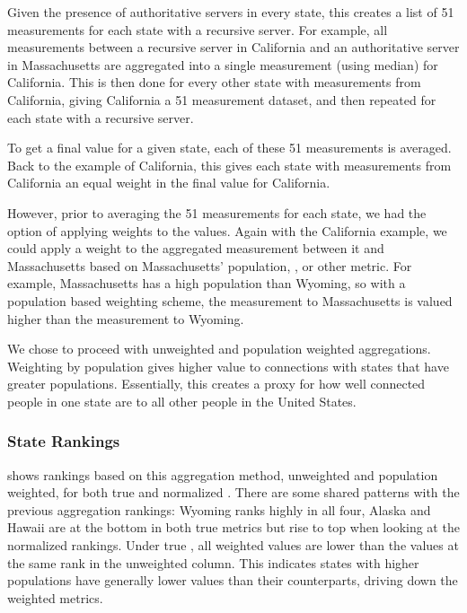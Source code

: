Given the presence of authoritative servers in every state, this creates a list of 51 measurements for each state with a recursive server. For example, all measurements between a recursive server in California and an authoritative server in Massachusetts are aggregated into a single measurement (using median) for California. This is then done for every other state with measurements from California, giving California a 51 measurement dataset, and then repeated for each state with a recursive server. 

To get a final value for a given state, each of these 51 measurements is averaged. Back to the example of California, this gives each state with measurements from California an equal weight in the final value for California. 

However, prior to averaging the 51 measurements for each state, we had the option of applying weights to the values. Again with the California example, we could apply a weight to the aggregated measurement between it and Massachusetts based on Massachusetts' population, \gdp, or other metric. For example, Massachusetts has a high population than Wyoming, so with a population based weighting scheme, the measurement to Massachusetts is valued higher than the measurement to Wyoming.

We chose to proceed with unweighted and population weighted aggregations. Weighting by population gives higher value to connections with states that have greater populations. Essentially, this creates a proxy for how well connected people in one state are to all other people in the United States.

\subsubsection{State Rankings}

 shows rankings based on this aggregation method, unweighted and population weighted, for both true \dns \rtt and normalized \dns \rtt. There are some shared patterns with the previous aggregation rankings: Wyoming ranks highly in all four, Alaska and Hawaii are at the bottom in both true \rtt metrics but rise to top when looking at the normalized rankings. Under true \rtt, all weighted \rtt values are lower than the values at the same rank in the unweighted column. This indicates states with higher populations have generally lower values than their counterparts, driving down the weighted metrics.



